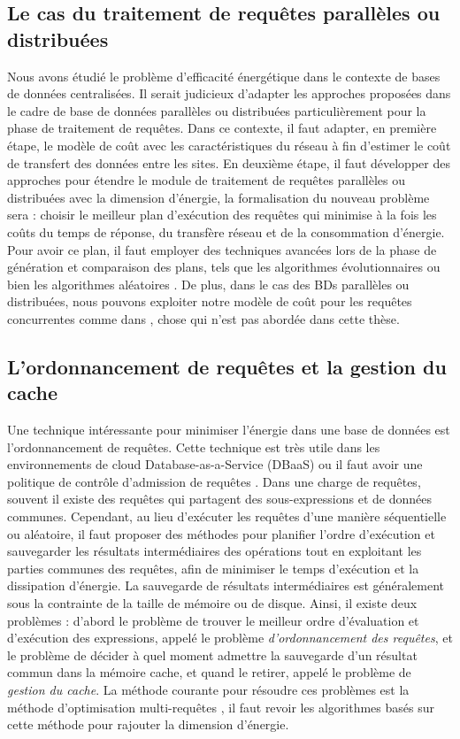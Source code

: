 \subsection{Le cas du traitement de requêtes parallèles ou distribuées}
Nous avons étudié le problème d'efficacité énergétique dans le contexte de bases de données centralisées. Il serait judicieux d'adapter les approches proposées dans le cadre de base de données parallèles ou distribuées particulièrement pour la phase de traitement de requêtes. Dans ce contexte, il faut adapter, en première étape, le modèle de coût avec les caractéristiques du réseau à fin d'estimer le coût de transfert des données entre les sites. En deuxième étape, il faut développer des approches pour étendre le module de traitement de requêtes parallèles ou distribuées avec la dimension d'énergie, la formalisation du nouveau problème sera : choisir le meilleur plan d'exécution des requêtes qui minimise à la fois les coûts du temps de réponse, du transfère réseau et de la consommation d'énergie. Pour avoir ce plan, il faut employer des techniques avancées lors de la phase de génération et comparaison des plans, tels que les algorithmes évolutionnaires ou bien les algorithmes aléatoires \cite{Trummer16b}. De plus, dans le cas des BDs parallèles ou distribuées, nous pouvons exploiter notre modèle de coût pour les requêtes concurrentes comme dans \cite{Psaroudakis13}, chose qui n'est pas abordée dans cette thèse.

 
\subsection{L'ordonnancement de requêtes et la gestion du cache}
Une technique intéressante pour minimiser l'énergie dans une base de données est l'ordonnancement de requêtes. Cette technique est très utile dans les environnements de cloud Database-as-a-Service (DBaaS) ou il faut avoir une politique de contrôle d'admission de requêtes \cite{Xiong11,Chi11,Chi13}. Dans une charge de requêtes, souvent il existe des requêtes qui partagent des sous-expressions et de données communes. Cependant, au lieu d'exécuter les requêtes d'une manière séquentielle ou aléatoire, il faut proposer des méthodes pour planifier l'ordre d'exécution et sauvegarder les résultats intermédiaires des opérations tout en exploitant les parties communes des requêtes, afin de minimiser le temps d'exécution et la dissipation d'énergie. La sauvegarde de résultats intermédiaires est généralement sous la contrainte de la taille de mémoire ou de disque. Ainsi, il existe deux problèmes : d'abord le problème de trouver le meilleur ordre d'évaluation et d'exécution des expressions, appelé le problème \textit{d'ordonnancement des requêtes}, et le problème de décider à quel moment admettre la sauvegarde d'un résultat commun dans la mémoire cache, et quand le retirer, appelé le problème de \textit{gestion du cache}. La méthode courante pour résoudre ces problèmes est la méthode d'optimisation multi-requêtes \cite{Sellis88,Gupta01,Diwan06}, il faut revoir les algorithmes basés sur cette méthode pour rajouter la dimension d'énergie.

